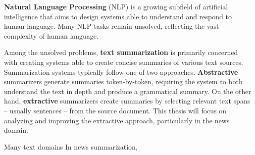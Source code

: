 \textbf{Natural Language Processing} (NLP) is a growing subfield of artificial intelligence that aims to design systems able to understand and respond to human language. Many NLP tasks remain unsolved, reflecting the vast complexity of human language.

Among the unsolved problems, \textbf{text summarization} is primarily concerned with creating systems able to create concise summaries of various text sources. Summarization systems typically follow one of two approaches. \textbf{Abstractive} summarizers generate summaries token-by-token, requiring the system to both understand the text in depth and produce a grammatical summary. 
On the other hand, \textbf{extractive} summarizers create summaries by selecting relevant text spans -- usually sentences -- from the source document.
This thesis will focus on analyzing and improving the extractive approach, particularly in the news domain.

% 

Many text domains 
In news summarization, 



